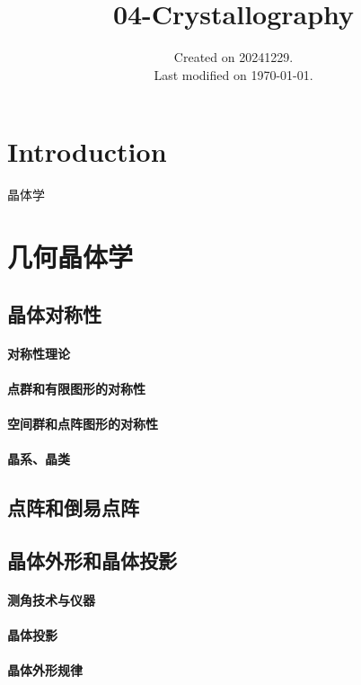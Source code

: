 \documentclass[UTF8]{../NatureUniverse}
\begin{document}
\title{04-Crystallography}
\date{Created on 20241229.\\   Last modified on \today.}
\maketitle
\tableofcontents

\chapter{Introduction}


晶体学




\chapter{几何晶体学}
\section{晶体对称性}
    \subsubsection{对称性理论}
    \subsubsection{点群和有限图形的对称性}
    \subsubsection{空间群和点阵图形的对称性}
    \subsubsection{晶系、晶类}
\section{点阵和倒易点阵}
\section{晶体外形和晶体投影}
    \subsubsection{测角技术与仪器}
    \subsubsection{晶体投影}
    \subsubsection{晶体外形规律}
\end{document}
